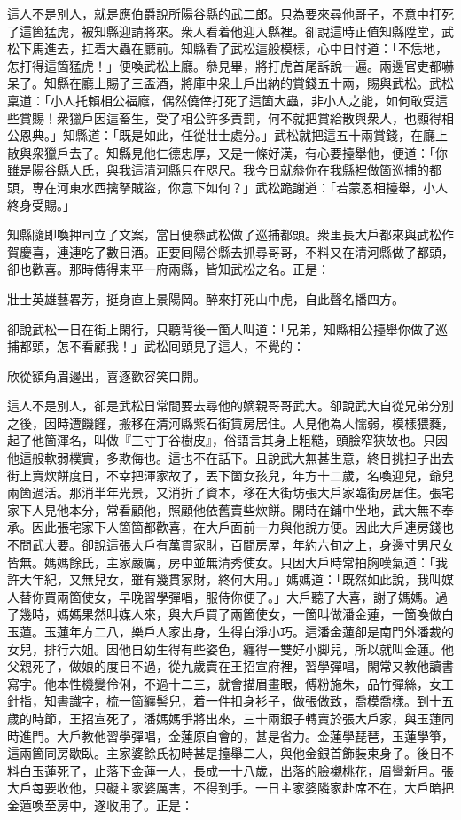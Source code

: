 這人不是別人，就是應伯爵說所陽谷縣的武二郎。只為要來尋他哥子，不意中打死了這箇猛虎，被知縣迎請將來。衆人看着他迎入縣裡。卻說這時正值知縣陞堂，武松下馬進去，扛着大蟲在廳前。知縣看了武松這般模樣，心中自忖道：「不恁地，怎打得這箇猛虎！」便喚武松上廳。叅見畢，將打虎首尾訴說一遍。兩邊官吏都嚇呆了。知縣在廳上賜了三盃酒，將庫中衆土戶出納的賞錢五十兩，賜與武松。武松稟道：「小人托賴相公福廕，偶然僥倖打死了這箇大蟲，非小人之能，如何敢受這些賞賜！衆獵戶因這畜生，受了相公許多責罰，何不就把賞給散與衆人，也顯得相公恩典。」{}知縣道：「既是如此，任從壯士處分。」武松就把這五十兩賞錢，在廳上散與衆獵戶去了。知縣見他仁德忠厚，又是一條好漢，有心要擡舉他，便道：「你雖是陽谷縣人氏，與我這清河縣只在咫尺。我今日就叅你在我縣裡做箇巡捕的都頭，專在河東水西擒拏賊盜，你意下如何？」武松跪謝道：「若蒙恩相擡舉，小人終身受賜。」

知縣隨即喚押司立了文案，當日便叅武松做了巡捕都頭。衆里長大戶都來與武松作賀慶喜，連連吃了數日酒。正要囘陽谷縣去抓尋哥哥，不料又在清河縣做了都頭，卻也歡喜。那時傳得東平一府兩縣，皆知武松之名。正是：

壯士英雄藝畧芳，挺身直上景陽岡。醉來打死山中虎，自此聲名播四方。

卻說武松一日在街上閑行，只聽背後一箇人叫道：「兄弟，知縣相公擡舉你做了巡捕都頭，怎不看顧我！」武松囘頭見了這人，不覺的：

欣從額角眉邊出，喜逐歡容笑口開。

這人不是別人，卻是武松日常間要去尋他的嫡親哥哥武大。卻說武大自從兄弟分別之後，因時遭饑饉，搬移在清河縣紫石街賃房居住。人見他為人懦弱，模樣猥蕤，起了他箇渾名，叫做『三寸丁谷樹皮』，俗語言其身上粗糙，頭臉窄狹故也。只因他這般軟弱樸實，多欺侮也。這也不在話下。且說武大無甚生意，終日挑担子出去街上賣炊餅度日，不幸把渾家故了，丟下箇女孩兒，年方十二歲，名喚迎兒，爺兒兩箇過活。那消半年光景，又消折了資本，移在大街坊張大戶家臨街房居住。張宅家下人見他本分，常看顧他，照顧他依舊賣些炊餅。閑時在鋪中坐地，武大無不奉承。因此張宅家下人箇箇都歡喜，在大戶面前一力與他說方便。因此大戶連房錢也不問武大要。卻說這張大戶有萬貫家財，百間房屋，年約六旬之上，身邊寸男尺女皆無。媽媽餘氏，主家嚴厲，房中並無清秀使女。只因大戶時常拍胸嘆氣道：「我許大年紀，又無兒女，雖有幾貫家財，終何大用。」媽媽道：「既然如此說，我叫媒人替你買兩箇使女，早晚習學彈唱，服侍你便了。」大戶聽了大喜，謝了媽媽。過了幾時，媽媽果然叫媒人來，與大戶買了兩箇使女，一箇叫做潘金蓮，一箇喚做白玉蓮。玉蓮年方二八，樂戶人家出身，生得白淨小巧。這潘金蓮卻是南門外潘裁的女兒，排行六姐。因他自幼生得有些姿色，纏得一雙好小脚兒，{}所以就叫金蓮。他父親死了，做娘的度日不過，從九歲賣在王招宣府裡，{}習學彈唱，閑常又教他讀書寫字。他本性機變伶俐，不過十二三，就會描眉畫眼，傅粉施朱，品竹彈絲，女工針指，知書識字，梳一箇纏髻兒，着一件扣身衫子，做張做致，喬模喬樣。{}到十五歲的時節，王招宣死了，潘媽媽爭將出來，三十兩銀子轉賣於張大戶家，與玉蓮同時進門。大戶教他習學彈唱，金蓮原自會的，甚是省力。金蓮學琵琶，玉蓮學箏，這兩箇同房歇臥。主家婆餘氏初時甚是擡舉二人，與他金銀首飾裝束身子。後日不料白玉蓮死了，止落下金蓮一人，長成一十八歲，出落的臉襯桃花，眉彎新月。張大戶每要收他，只礙主家婆厲害，不得到手。{}一日主家婆隣家赴席不在，大戶暗把金蓮喚至房中，遂收用了。正是：

